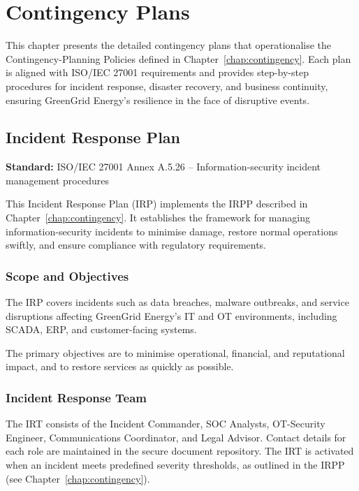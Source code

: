 \chapter{Contingency Plans}
\label{chap:contingency_plans}

This chapter presents the detailed contingency plans that operationalise the Contingency-Planning Policies defined in Chapter~\ref{chap:contingency}. Each plan is aligned with ISO/IEC 27001 requirements and provides step-by-step procedures for incident response, disaster recovery, and business continuity, ensuring GreenGrid Energy's resilience in the face of disruptive events.

\section{Incident Response Plan}
\label{sec:IRP_plan}
\textbf{Standard:} ISO/IEC 27001 Annex A.5.26 – Information-security incident management procedures

This Incident Response Plan (IRP) implements the \ac{IRPP} described in Chapter~\ref{chap:contingency}. It establishes the framework for managing information-security incidents to minimise damage, restore normal operations swiftly, and ensure compliance with regulatory requirements.

\subsection{Scope and Objectives}
The \ac{IRP} covers incidents such as data breaches, malware outbreaks, and service disruptions affecting GreenGrid Energy's IT and OT environments, including \ac{SCADA}, \ac{ERP}, and customer-facing systems.

The primary objectives are to minimise operational, financial, and reputational impact, and to restore services as quickly as possible.

\subsection{Incident Response Team}
The \ac{IRT} consists of the Incident Commander, \ac{SOC} Analysts, OT-Security Engineer, Communications Coordinator, and Legal Advisor. Contact details for each role are maintained in the secure document repository. The \ac{IRT} is activated when an incident meets predefined severity thresholds, as outlined in the \ac{IRPP} (see Chapter~\ref{chap:contingency}).

